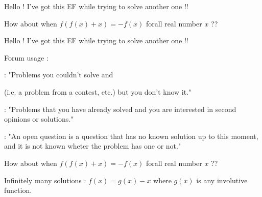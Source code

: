 \begin{solution}
	Hello ! I've got this EF while trying to solve another one !! 

How about when $ f(f(x)+x)=-f(x) $ forall real number $x$ ??
\end{solution}



\begin{solution}
	\begin{tcolorbox}Hello ! I've got this EF while trying to solve another one !! \end{tcolorbox}
Forum usage :

 : "Problems you couldn't solve and  (i.e. a problem from a contest, etc.) but you don't know it."

 : "Problems that you have already solved and you are interested in second opinions or solutions."

 : "An open question is a question that has no known solution up to this moment, and it is not known wheter the problem has one or not."
\end{solution}



\begin{solution}
	\begin{tcolorbox}How about when $ f(f(x)+x)=-f(x) $ forall real number $x$ ??\end{tcolorbox}
Infinitely many solutions : $f(x)=g(x)-x$ where $g(x)$ is any involutive function.
\end{solution}



